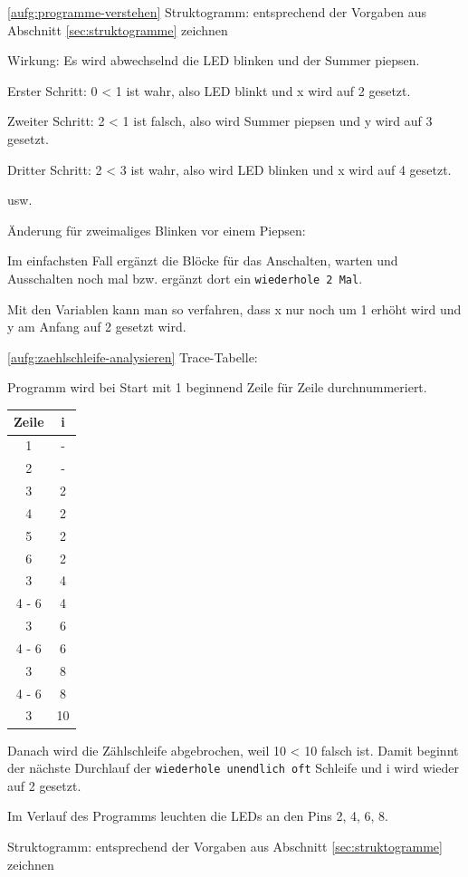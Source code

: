 \begin{loesung}{\ref{aufg:programme-verstehen}}
	Struktogramm: entsprechend der Vorgaben aus Abschnitt \ref{sec:struktogramme} zeichnen
	
	\medskip
	Wirkung: Es wird abwechselnd die LED blinken und der Summer piepsen. 
	
	Erster Schritt: 0 < 1 ist wahr, also LED blinkt und x wird auf 2 gesetzt. 
	
	Zweiter Schritt: 2 < 1 ist falsch, also wird Summer piepsen und y wird auf 3 gesetzt.
	
	Dritter Schritt: 2 < 3 ist wahr, also wird LED blinken und x wird auf 4 gesetzt.
	
	usw.
	
	\medskip
	Änderung für zweimaliges Blinken vor einem Piepsen:
	
	Im einfachsten Fall ergänzt die Blöcke für das Anschalten, warten und Ausschalten noch mal bzw. ergänzt dort ein \texttt{wiederhole 2 Mal}.
	
	Mit den Variablen kann man so verfahren, dass x nur noch um 1 erhöht wird und y am Anfang auf 2 gesetzt wird.
\end{loesung}

\begin{loesung}{\ref{aufg:zaehlschleife-analysieren}}
	Trace-Tabelle:
	
	Programm wird bei Start mit 1 beginnend Zeile für Zeile durchnummeriert.
	
	\begin{tabular}{c|c}
		Zeile & i \\ \hline
		1 & - \\
		2 & - \\
		3 & 2 \\
		4 & 2 \\
		5 & 2 \\
		6 & 2 \\
		3 & 4 \\
		4 - 6 & 4 \\
		3 & 6 \\
		4 - 6 & 6 \\
		3 & 8 \\
		4 - 6 & 8 \\
		3 & 10 \\
	\end{tabular}

	Danach wird die Zählschleife abgebrochen, weil 10 < 10 falsch ist. Damit beginnt der nächste Durchlauf der \texttt{wiederhole unendlich oft} Schleife und i wird wieder auf 2 gesetzt.
	
	Im Verlauf des Programms leuchten die LEDs an den Pins 2, 4, 6, 8.
	
	Struktogramm: entsprechend der Vorgaben aus Abschnitt \ref{sec:struktogramme} zeichnen
\end{loesung}


